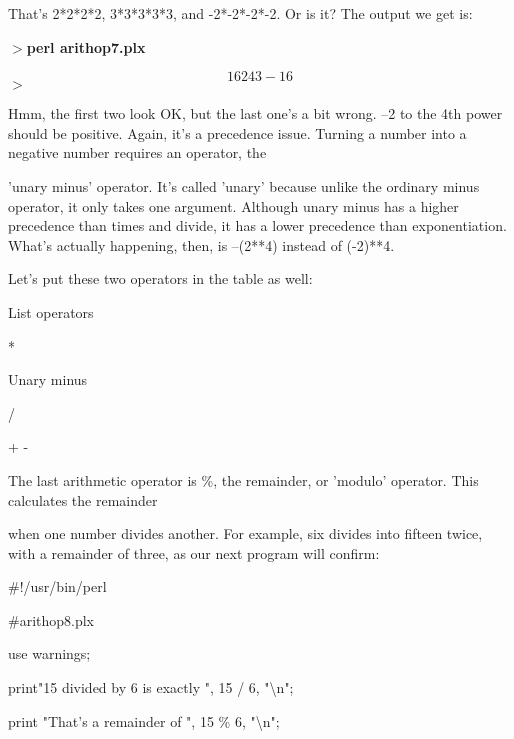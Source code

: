\documentclass[a4paper,11pt]{book}
\begin{document}
\noindent 

\noindent That's 2*2*2*2, 3*3*3*3*3, and -2*-2*-2*-2. Or is it? The output we get is:

\noindent $>$\textbf{perl arithop7.plx}

\[16 243 -16\] 
$>$

\noindent 

\noindent Hmm, the first two look OK, but the last one's a bit wrong. --2 to the 4th   power should be positive. Again, it's a precedence issue. Turning a number into a negative number requires an operator, the

\noindent 'unary minus' operator. It's called 'unary' because unlike the ordinary minus operator, it only takes one argument. Although unary minus has a higher precedence than times and divide, it has a lower precedence than exponentiation. What's actually happening, then, is --(2**4) instead of (-2)**4.

\noindent Let's put these two operators in the table as well:

\noindent 

\noindent 

\noindent List operators

\noindent 

\noindent **

\noindent 

\noindent Unary minus

\noindent 

\noindent * /

\noindent 

\noindent + -

\noindent 

\noindent 

\noindent The last arithmetic operator is \%, the remainder, or 'modulo' operator. This calculates the remainder

\noindent when one number divides another. For example, six divides into fifteen twice, with a remainder of three, as our next program will confirm:

\noindent 

\noindent 

\noindent \#!/usr/bin/perl

\noindent \#arithop8.plx

\noindent use warnings;

\noindent print"15 divided by 6 is exactly ", 15 / 6, "\textbackslash n";

\noindent print "That's a remainder of ", 15 \% 6, "\textbackslash n";
\end{document}
